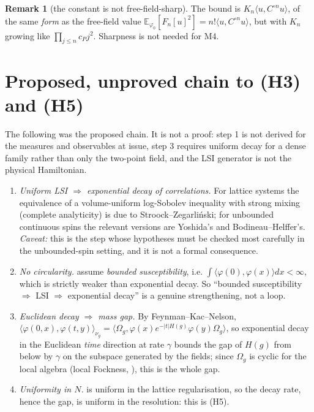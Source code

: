 \documentclass[11pt,a4paper]{article}
\theoremstyle{plain}
\theoremstyle{definition}
\newtheorem{remark}[theorem]{Remark}
\newcommand{\Om}{\Omega}
\newcommand{\E}{\mathbb{E}}
\newcommand{\ip}[2]{\langle #1,#2\rangle}
\begin{document}
\begin{remark}[the constant is not free-field-sharp]
The bound is $K_n\ip{u}{C^{\circ n}u}$, of the same \emph{form} as the free-field value
$\E_{\varphi_0}[F_n[u]^2]=n!\ip{u}{C^{\circ n}u}$, but with $K_n$ growing like
$\prod_{j\le n}c_Pj^2$. Sharpness is not needed for M4.
\end{remark}

\section{Proposed, unproved chain to (H3) and (H5)}\label{sec:gap}

The following was the proposed chain.  It is not a proof: step 1 is not derived for the measures
and observables at issue, step 3 requires uniform decay for a dense family rather than only the
two-point field, and the LSI generator is not the physical Hamiltonian.

\begin{enumerate}
\item \emph{Uniform LSI $\Rightarrow$ exponential decay of correlations.} For lattice systems the
      equivalence of a volume-uniform log-Sobolev inequality with strong mixing (complete
      analyticity) is due to Stroock--Zegarli\'nski; for unbounded continuous spins the relevant
      versions are Yoshida's and Bodineau--Helffer's. \emph{Caveat:} this is the step whose
      hypotheses must be checked most carefully in the unbounded-spin setting, and it is not a
      formal consequence.
\item \emph{No circularity.} \cite{BD} assume \emph{bounded susceptibility}, i.e.
      $\int\ip{\varphi(0)}{\varphi(x)}dx<\infty$, which is strictly weaker than exponential decay.
      So ``bounded susceptibility $\Rightarrow$ LSI $\Rightarrow$ exponential decay'' is a genuine
      strengthening, not a loop.
\item \emph{Euclidean decay $\Rightarrow$ mass gap.} By Feynman--Kac--Nelson,
      $\ip{\varphi(0,x)}{\varphi(t,y)}_{\nu_g}
      =\ip{\Om_g}{\varphi(x)e^{-|t|H(g)}\varphi(y)\Om_g}$, so exponential decay in the Euclidean
      \emph{time} direction at rate $\gamma$ bounds the gap of $H(g)$ from below by $\gamma$ on
      the subspace generated by the fields; since $\Om_g$ is cyclic for the local algebra
      (local Fockness, \cite{GJIII}), this is the whole gap.
\item \emph{Uniformity in $N$.} \cite{BD} is uniform in the lattice regularisation, so the decay
      rate, hence the gap, is uniform in the resolution: this is \textup{(H5)}.
\end{enumerate}
\end{document}

